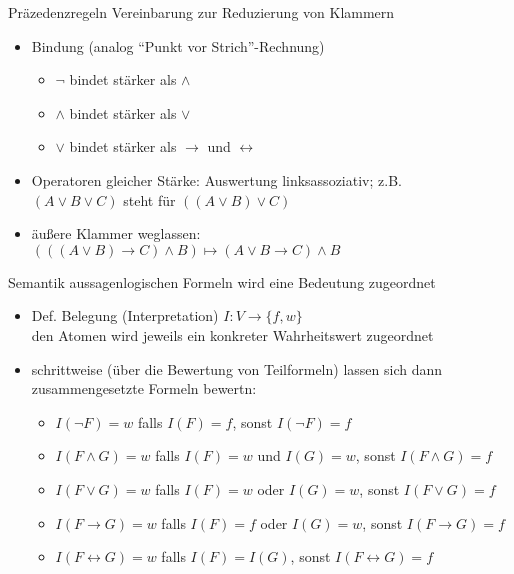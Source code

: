 \begin{frame}{Präzedenzregeln}
	Vereinbarung zur Reduzierung von Klammern
	\begin{itemize}
		\item Bindung (analog "`Punkt vor Strich"'-Rechnung)
		\begin{itemize}
			\item $\neg$ bindet stärker als $\land$
			\item $\land$ bindet stärker als $\lor$
			\item $\lor$ bindet stärker als $\rightarrow$ und $\leftrightarrow$
		\end{itemize}
		\item Operatoren gleicher Stärke: Auswertung linksassoziativ; z.B. \\ $(A \lor B \lor C)$ steht für $((A \lor B) \lor C)$
		\item äußere Klammer weglassen: $(((A \lor B) \rightarrow C) \land B) \mapsto (A \lor B \rightarrow C) \land B$
	\end{itemize}
\end{frame}

\begin{frame}{Semantik}
	aussagenlogischen Formeln wird eine Bedeutung zugeordnet
	\begin{itemize}
		\item Def. Belegung (Interpretation) $I: V \rightarrow \{f, w\}$\\ den Atomen wird jeweils ein konkreter Wahrheitswert zugeordnet
		\item schrittweise (über die Bewertung von Teilformeln) lassen sich dann zusammengesetzte Formeln bewertn:
		\begin{itemize}
			\item $I(\neg F)=w$ falls $I(F)=f$, sonst $I(\neg F)=f$
			\item $I(F \land G)=w$ falls $I(F)=w$ und $I(G)=w$, sonst $I(F \land G)=f$
			\item $I(F \lor G)=w$ falls $I(F)=w$ oder $I(G)=w$, sonst $I(F \lor G)=f$
			\item $I(F \rightarrow G)=w$ falls $I(F)=f$ oder $I(G)=w$, sonst $I(F \rightarrow G)=f$
			\item $I(F \leftrightarrow G)=w$ falls $I(F)=I(G)$, sonst $I(F \leftrightarrow G)=f$
		\end{itemize}
	\end{itemize}
\end{frame}

